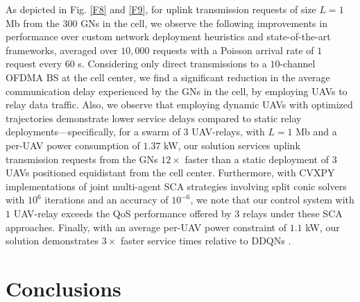 \documentclass[12pt, draftcls, onecolumn]{IEEEtran}
\theoremstyle{plain}
\theoremstyle{definition}
\theoremstyle{remark}
\newcommand{\bk}[1]{\textcolor{blue}{[BK: #1]}}
\begin{document}
As depicted in Fig. \ref{F8} and \ref{F9}, for uplink transmission requests of size $L{=}1$ Mb from the $300$ GNs in the cell, we observe the following improvements in performance over custom network deployment heuristics and state-of-the-art frameworks, averaged over $10,000$ requests with a Poisson arrival rate of $1$ request every $60$ s. Considering only direct transmissions to a $10$-channel OFDMA BS at the cell center, we find a significant reduction in the average communication delay experienced by the GNs in the cell, by employing UAVs to relay data traffic. Also, we observe that employing dynamic UAVs with optimized trajectories demonstrate lower service delays compared to static relay deployments---specifically, for a swarm of $3$ UAV-relays, with $L{=}1$ Mb and a per-UAV power consumption of $1.37$ kW, our solution services uplink transmission requests from the GNs $12{\times}$ faster than a static deployment of $3$ UAVs positioned equidistant from the cell center. Furthermore, with CVXPY implementations of joint multi-agent SCA strategies \cite{SCA, CSCA-ADMM} involving split conic solvers with $10^{6}$ iterations and an accuracy of $10^{-6}$, we note that our control system with $1$ UAV-relay exceeds the QoS performance offered by $3$ relays under these SCA approaches. Finally, with an average per-UAV power constraint of $1.1$ kW, our solution demonstrates $3{\times}$ faster service times relative to DDQNs \cite{DDQN}.
\vspace{-4mm}





\section{Conclusions}\label{S8}
\vspace{-2mm}
\end{document}
